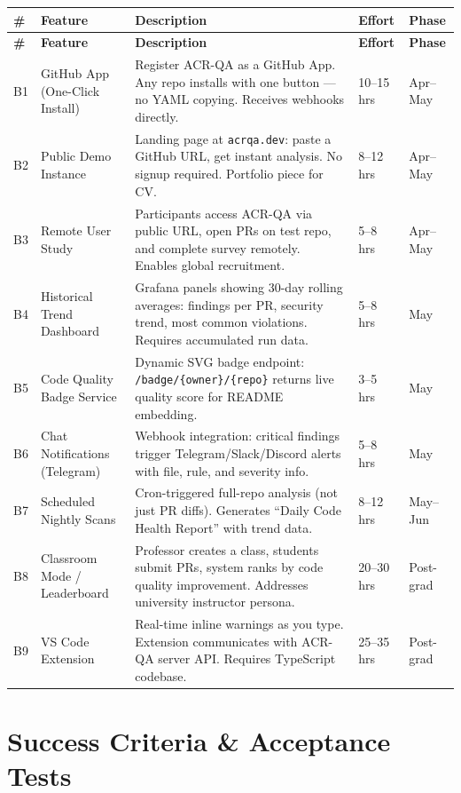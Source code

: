 \documentclass[11pt,a4paper]{article}
\begin{document}
\begin{longtable}{p{0.5cm}p{4cm}p{5.5cm}p{2cm}p{1.5cm}}
\toprule
\textbf{\#} & \textbf{Feature} & \textbf{Description} & \textbf{Effort} & \textbf{Phase} \\
\midrule
\endfirsthead
\toprule
\textbf{\#} & \textbf{Feature} & \textbf{Description} & \textbf{Effort} & \textbf{Phase} \\
\midrule
\endhead
B1 & GitHub App (One-Click Install) & Register ACR-QA as a GitHub App. Any repo installs with one button --- no YAML copying. Receives webhooks directly. & 10--15 hrs & Apr--May \\
\midrule
B2 & Public Demo Instance & Landing page at \texttt{acrqa.dev}: paste a GitHub URL, get instant analysis. No signup required. Portfolio piece for CV. & 8--12 hrs & Apr--May \\
\midrule
B3 & Remote User Study & Participants access ACR-QA via public URL, open PRs on test repo, and complete survey remotely. Enables global recruitment. & 5--8 hrs & Apr--May \\
\midrule
B4 & Historical Trend Dashboard & Grafana panels showing 30-day rolling averages: findings per PR, security trend, most common violations. Requires accumulated run data. & 5--8 hrs & May \\
\midrule
B5 & Code Quality Badge Service & Dynamic SVG badge endpoint: \texttt{/badge/\{owner\}/\{repo\}} returns live quality score for README embedding. & 3--5 hrs & May \\
\midrule
B6 & Chat Notifications (Telegram) & Webhook integration: critical findings trigger Telegram/Slack/Discord alerts with file, rule, and severity info. & 5--8 hrs & May \\
\midrule
B7 & Scheduled Nightly Scans & Cron-triggered full-repo analysis (not just PR diffs). Generates ``Daily Code Health Report'' with trend data. & 8--12 hrs & May--Jun \\
\midrule
B8 & Classroom Mode / Leaderboard & Professor creates a class, students submit PRs, system ranks by code quality improvement. Addresses university instructor persona. & 20--30 hrs & Post-grad \\
\midrule
B9 & VS Code Extension & Real-time inline warnings as you type. Extension communicates with ACR-QA server API. Requires TypeScript codebase. & 25--35 hrs & Post-grad \\
\bottomrule
\end{longtable}

\section{Success Criteria \& Acceptance Tests}
\end{document}
